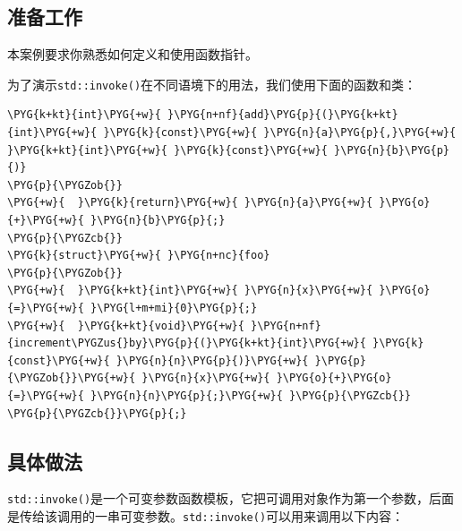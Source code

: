 
\subsection{准备工作}



本案例要求你熟悉如何定义和使用函数指针。



为了演示\texttt{std::\allowbreak{}invoke()}在不同语境下的用法，我们使用下面的函数和类：



\begin{codeblockbg}
\begin{Verbatim}[commandchars=\\\{\},breaklines=true,breakanywhere=true,fontsize=\codefont,xleftmargin=17bp]
\PYG{k+kt}{int}\PYG{+w}{ }\PYG{n+nf}{add}\PYG{p}{(}\PYG{k+kt}{int}\PYG{+w}{ }\PYG{k}{const}\PYG{+w}{ }\PYG{n}{a}\PYG{p}{,}\PYG{+w}{ }\PYG{k+kt}{int}\PYG{+w}{ }\PYG{k}{const}\PYG{+w}{ }\PYG{n}{b}\PYG{p}{)}
\PYG{p}{\PYGZob{}}
\PYG{+w}{  }\PYG{k}{return}\PYG{+w}{ }\PYG{n}{a}\PYG{+w}{ }\PYG{o}{+}\PYG{+w}{ }\PYG{n}{b}\PYG{p}{;}
\PYG{p}{\PYGZcb{}}
\PYG{k}{struct}\PYG{+w}{ }\PYG{n+nc}{foo}
\PYG{p}{\PYGZob{}}
\PYG{+w}{  }\PYG{k+kt}{int}\PYG{+w}{ }\PYG{n}{x}\PYG{+w}{ }\PYG{o}{=}\PYG{+w}{ }\PYG{l+m+mi}{0}\PYG{p}{;}
\PYG{+w}{  }\PYG{k+kt}{void}\PYG{+w}{ }\PYG{n+nf}{increment\PYGZus{}by}\PYG{p}{(}\PYG{k+kt}{int}\PYG{+w}{ }\PYG{k}{const}\PYG{+w}{ }\PYG{n}{n}\PYG{p}{)}\PYG{+w}{ }\PYG{p}{\PYGZob{}}\PYG{+w}{ }\PYG{n}{x}\PYG{+w}{ }\PYG{o}{+}\PYG{o}{=}\PYG{+w}{ }\PYG{n}{n}\PYG{p}{;}\PYG{+w}{ }\PYG{p}{\PYGZcb{}}
\PYG{p}{\PYGZcb{}}\PYG{p}{;}
\end{Verbatim}
\end{codeblockbg}



\subsection{具体做法}



\texttt{std::\allowbreak{}invoke()}是一个可变参数函数模板，它把可调用对象作为第一个参数，后面是传给该调用的一串可变参数。\texttt{std::\allowbreak{}invoke()}可以用来调用以下内容：



